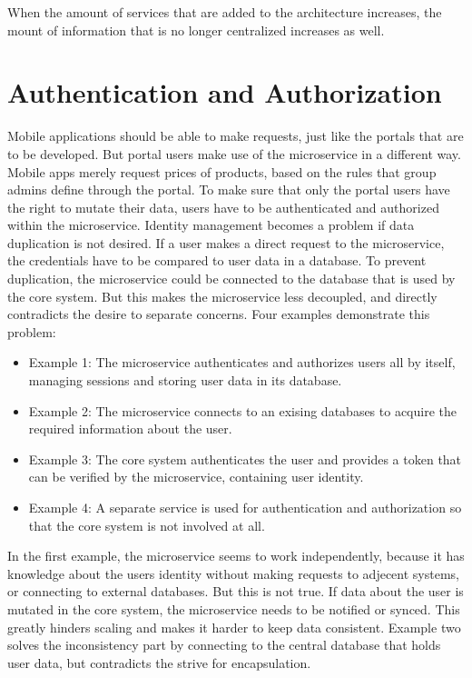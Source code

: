 When the amount of services that are added to the architecture increases, the mount of information that is no longer centralized increases as well.

%
\section{Authentication and Authorization}
Mobile applications should be able to make requests, just like the portals that are to be developed. But portal users make use of the microservice in a different way. Mobile apps merely request prices of products, based on the rules that group admins define through the portal. To make sure that only the portal users have the right to mutate their data, users have to be authenticated and authorized within the microservice. Identity management becomes a problem if data duplication is not desired. If a user makes a direct request to the microservice, the credentials have to be compared to user data in a database. To prevent duplication, the microservice could be connected to the database that is used by the core system. But this makes the microservice less decoupled, and directly contradicts the desire to separate concerns. Four examples demonstrate this problem:

\begin{itemize}
	\item Example 1: The microservice authenticates and authorizes users all by itself, managing sessions and storing user data in its database.
	\item Example 2: The microservice connects to an exising databases to acquire the required information about the user.
	\item Example 3: The core system authenticates the user and provides a token that can be verified by the microservice, containing user identity.
	\item Example 4: A separate service is used for authentication and authorization so that the core system is not involved at all.
\end{itemize}

In the first example, the microservice seems to work independently, because it has knowledge about the users identity without making requests to adjecent systems, or connecting to external databases. But this is not true. If data about the user is mutated in the core system, the microservice needs to be notified or synced. This greatly hinders scaling and makes it harder to keep data consistent. Example two solves the inconsistency part by connecting to the central database that holds user data, but contradicts the strive for encapsulation.

